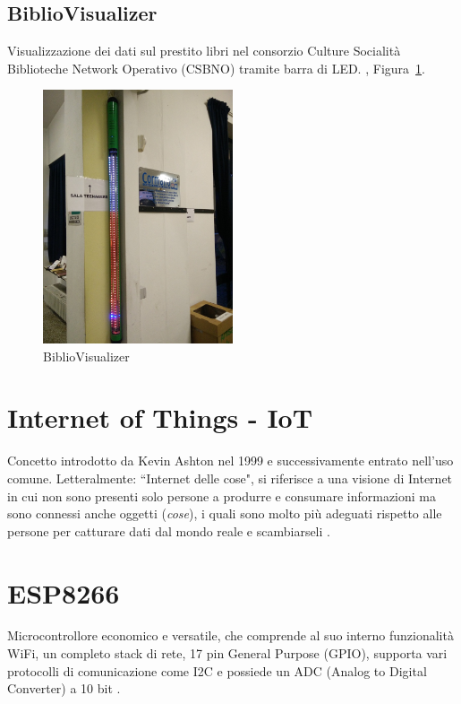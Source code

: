\documentclass[12pt,a4paper]{report}
\begin{document}
\subsection{BiblioVisualizer}
Visualizzazione dei dati sul prestito libri nel consorzio Culture Socialità Biblioteche Network Operativo (CSBNO) tramite barra di LED.
\cite{bibliovisgitlab}, Figura~\ref{fig:bibliovisualizer}.
\begin{figure}[h]
  \centering
  \includegraphics[width=0.5\textwidth]{bibliovisualizer}
  \caption{BiblioVisualizer}
  \label{fig:bibliovisualizer}
\end{figure}

\section{Internet of Things - IoT}
Concetto introdotto da Kevin Ashton nel 1999 e successivamente entrato nell'uso comune. Letteralmente: ``Internet delle cose",
si riferisce a una visione di Internet in cui non sono presenti solo persone a produrre e consumare informazioni ma
sono connessi anche oggetti (\emph{cose}), i quali sono molto più adeguati rispetto alle persone per catturare dati dal mondo reale
e scambiarseli 
\cite{ashton2009internet}.

\section{ESP8266}
Microcontrollore economico e versatile, che comprende al suo interno funzionalità WiFi, un completo stack di rete, 17 pin General
Purpose (GPIO), supporta vari protocolli di comunicazione come I2C e possiede un ADC (Analog to Digital Converter) a 10 bit 
\cite{esp8266}.
\end{document}
